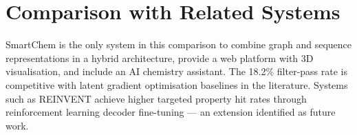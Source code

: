 \documentclass[12pt,a4paper]{report}
\begin{document}
\bigskip


\section{Comparison with Related Systems}

\begin{table}[htbp]
\centering
\caption{\textit{Feature comparison of SmartChem with related molecular generation systems.}}
\label{tab:platform_comparison}
\renewcommand{\arraystretch}{1.1}
\setlength{\tabcolsep}{4pt}
\small
{}
\end{table}

SmartChem is the only system in this comparison to combine graph and sequence representations in a hybrid architecture, provide a web platform with 3D visualisation, and include an AI chemistry assistant. The 18.2\% filter-pass rate is competitive with latent gradient optimisation baselines in the literature. Systems such as REINVENT achieve higher targeted property hit rates through reinforcement learning decoder fine-tuning — an extension identified as future work.
\end{document}
